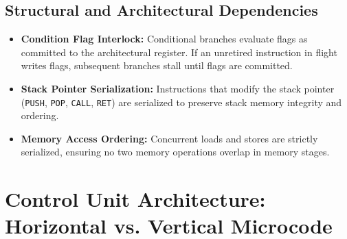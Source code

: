\documentclass[11pt,a4paper]{article}
\begin{document}
\subsection{Structural and Architectural Dependencies}
\begin{itemize}
    \item \textbf{Condition Flag Interlock:} Conditional branches evaluate flags as committed to the architectural register. If an unretired instruction in flight writes flags, subsequent branches stall until flags are committed.
    \item \textbf{Stack Pointer Serialization:} Instructions that modify the stack pointer (\texttt{PUSH}, \texttt{POP}, \texttt{CALL}, \texttt{RET}) are serialized to preserve stack memory integrity and ordering.
    \item \textbf{Memory Access Ordering:} Concurrent loads and stores are strictly serialized, ensuring no two memory operations overlap in memory stages.
\end{itemize}

\section{Control Unit Architecture: Horizontal vs. Vertical Microcode}
\end{document}
